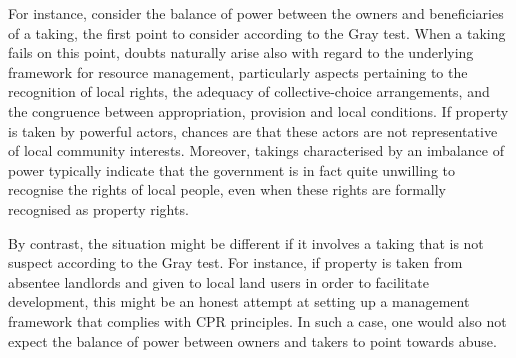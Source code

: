 
For instance, consider the balance of power between the owners and beneficiaries of a taking, the first point to consider according to the Gray test. When a taking fails on this point, doubts naturally arise also with regard to the underlying framework for resource management, particularly aspects pertaining to the recognition of local rights, the adequacy of collective-choice arrangements, and the congruence between appropriation, provision and local conditions. If property is taken by powerful actors, chances are that these actors are not representative of local community interests. Moreover, takings characterised by an imbalance of power typically indicate that the government is in fact quite unwilling to recognise the rights of local people, even when these rights are formally recognised as property rights.

By contrast, the situation might be different if it involves a taking that is not suspect according to the Gray test. For instance, if property is taken from absentee landlords and given to local land users in order to facilitate development, this might be an honest attempt at setting up a management framework that complies with CPR principles. In such a case, one would also not expect the balance of power between owners and takers to point towards abuse.

